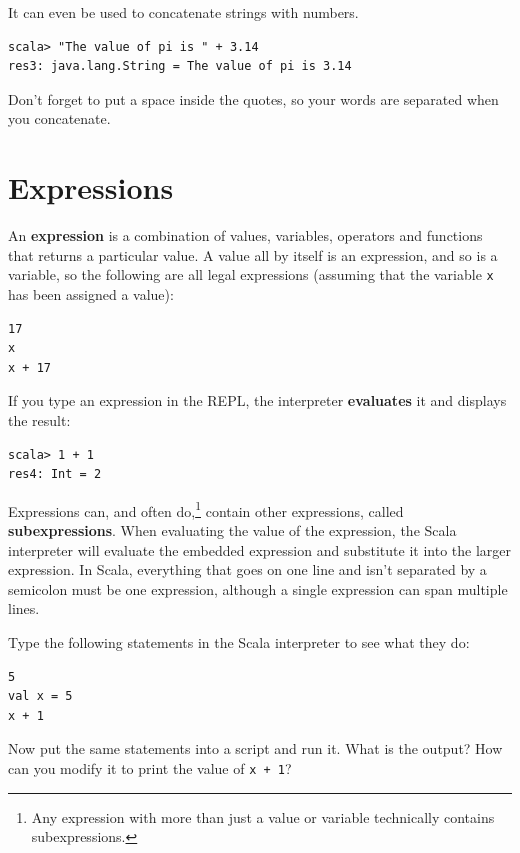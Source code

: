 \documentclass[10pt]{book}
\begin{document}
It can even be used to concatenate strings with numbers.

\beforeverb
\begin{verbatim}
scala> "The value of pi is " + 3.14
res3: java.lang.String = The value of pi is 3.14
\end{verbatim}
\afterverb

Don't forget to put a space inside the quotes, so your words are separated 
when you concatenate.

\section{Expressions}

An {\bf expression} is a combination of values, variables, operators
and functions that returns a particular value. A value all by itself 
is an expression, and so is a variable, so the following are all legal 
expressions (assuming that the variable {\tt x} has been assigned a value):


\beforeverb
\begin{verbatim}
17
x
x + 17
\end{verbatim}
\afterverb

If you type an expression in the REPL, the interpreter
{\bf evaluates} it and displays the result:

\beforeverb
\begin{verbatim}
scala> 1 + 1
res4: Int = 2
\end{verbatim}
\afterverb

Expressions can, and often do,\footnote{Any expression with more than just a value or 
variable technically contains subexpressions.} contain other expressions, called {\bf 
subexpressions}. When evaluating the value of the expression, the Scala interpreter 
will evaluate the embedded expression and substitute it into the larger expression. 
In Scala, everything that goes on one line and isn't separated by a semicolon must
 be one expression, although a single expression can span multiple lines.

\begin{ex}
Type the following statements in the Scala interpreter to see what they do:

\beforeverb
\begin{verbatim}
5
val x = 5
x + 1
\end{verbatim}
\afterverb

Now put the same statements into a script and run it. What
is the output? How can you modify it to print the value of {\tt x + 1}?
\end{ex}
\end{document}
